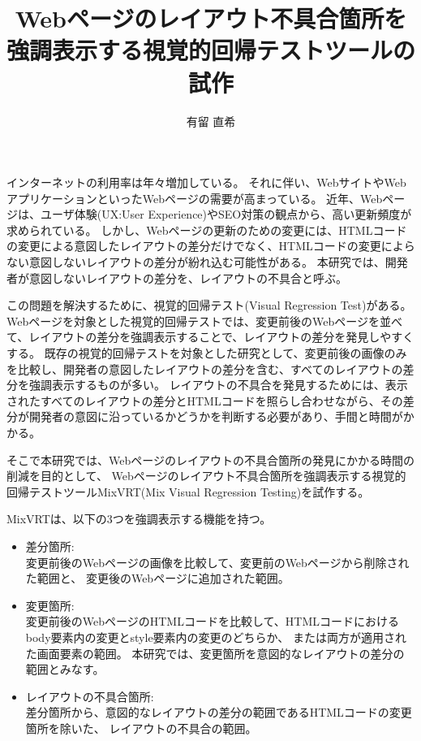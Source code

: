 \documentclass[uplatex, report, a4j, 10pt]{jsbook}
\title{Webページのレイアウト不具合箇所を\\強調表示する視覚的回帰テストツール\toolName の試作}
\author{有留 直希}
\newcommand{\toolName}{MixVRT}  %
\begin{document}
\maketitle

%
% 
インターネットの利用率は年々増加している。
それに伴い、WebサイトやWebアプリケーションといったWebページの需要が高まっている。
近年、Webページは、ユーザ体験(UX:User Experience)やSEO対策の観点から、高い更新頻度が求められている。
しかし、Webページの更新のための変更には、HTMLコードの変更による意図したレイアウトの差分だけでなく、HTMLコードの変更によらない意図しないレイアウトの差分が紛れ込む可能性がある。
本研究では、開発者が意図しないレイアウトの差分を、レイアウトの不具合と呼ぶ。
\par
この問題を解決するために、視覚的回帰テスト(Visual Regression Test)がある。
Webページを対象とした視覚的回帰テストでは、変更前後のWebページを並べて、レイアウトの差分を強調表示することで、レイアウトの差分を発見しやすくする。
既存の視覚的回帰テストを対象とした研究として、変更前後の画像のみを比較し、開発者の意図したレイアウトの差分を含む、すべてのレイアウトの差分を強調表示するものが多い。
レイアウトの不具合を発見するためには、表示されたすべてのレイアウトの差分とHTMLコードを照らし合わせながら、その差分が開発者の意図に沿っているかどうかを判断する必要があり、手間と時間がかかる。
\par
そこで本研究では、Webページのレイアウトの不具合箇所の発見にかかる時間の削減を目的として、
Webページのレイアウト不具合箇所を強調表示する視覚的回帰テストツール\toolName(Mix Visual Regression Testing)を試作する。
\par
\toolName は、以下の3つを強調表示する機能を持つ。
\begin{itemize}
      \item 差分箇所:\\
            変更前後のWebページの画像を比較して、変更前のWebページから削除された範囲と、
            変更後のWebページに追加された範囲。
      \item 変更箇所:\\
            変更前後のWebページのHTMLコードを比較して、HTMLコードにおけるbody要素内の変更とstyle要素内の変更のどちらか、
            または両方が適用された画面要素の範囲。
            本研究では、変更箇所を意図的なレイアウトの差分の範囲とみなす。
      \item レイアウトの不具合箇所:\\
            差分箇所から、意図的なレイアウトの差分の範囲であるHTMLコードの変更箇所を除いた、
            レイアウトの不具合の範囲。
\end{itemize}
\end{document}
